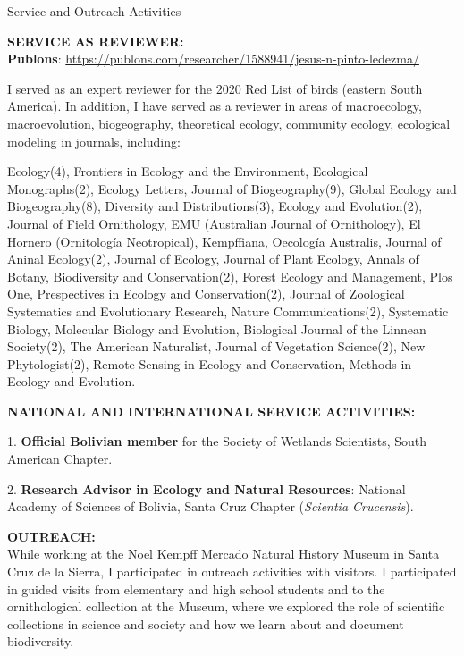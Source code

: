 \documentclass{resume} %
\begin{document}
\begin{rSection}{Service and Outreach Activities}

\textbf{SERVICE AS REVIEWER:} \smallskip \\ 
\textbf{Publons}: \url{https://publons.com/researcher/1588941/jesus-n-pinto-ledezma/}

I served as an expert reviewer for the 2020 Red List of birds (eastern South America). In addition, I have served as a reviewer in areas of macroecology, macroevolution, biogeography, theoretical ecology, community ecology, ecological modeling in journals, including:

Ecology(4), Frontiers in Ecology and the Environment, Ecological Monographs(2), Ecology Letters, Journal of Biogeography(9), Global Ecology and Biogeography(8), Diversity and Distributions(3), Ecology and Evolution(2), Journal of Field Ornithology, EMU (Australian Journal of Ornithology), El Hornero (Ornitología Neotropical), Kempffiana, Oecología Australis, Journal of Aninal Ecology(2), Journal of Ecology, Journal of Plant Ecology, Annals of Botany, Biodiversity and Conservation(2), Forest Ecology and Management, Plos One, Prespectives in Ecology and Conservation(2), Journal of Zoological Systematics and Evolutionary Research, Nature Communications(2), Systematic Biology, Molecular Biology and Evolution, Biological Journal of the Linnean Society(2), The American Naturalist, Journal of Vegetation Science(2), New Phytologist(2), Remote Sensing in Ecology and Conservation, Methods in Ecology and Evolution. 

\textbf{NATIONAL AND INTERNATIONAL SERVICE ACTIVITIES:} \smallskip 
\item 1. \textbf{Official Bolivian member} for the Society of Wetlands Scientists, South American Chapter. 
\item 2. \textbf{Research Advisor in Ecology and Natural Resources}: National Academy of Sciences of Bolivia, Santa Cruz Chapter ({\em Scientia Crucensis}). 


\textbf{OUTREACH:} \smallskip \\ 
While working at the Noel Kempff Mercado Natural History Museum in Santa Cruz de la Sierra, I participated in outreach activities with visitors. I participated in guided visits from elementary and high school students and to the ornithological collection at the Museum, where we explored the role of scientific collections in science and society and how we learn about and document biodiversity.


\end{rSection}
\end{document}
